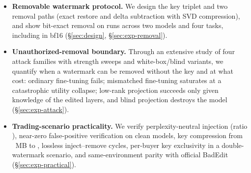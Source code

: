 \documentclass[conference,10pt]{IEEEtran}
\begin{document}
\begin{itemize}
\item \textbf{Removable watermark protocol.} We design the key triplet and
two removal paths (exact restore and delta subtraction with SVD
compression), and show bit-exact removal on \hashRestored{} runs across two
models and four tasks, including \llamasevenb{} in bf16
(\S\ref{sec:design}, \S\ref{sec:exp-removal}).
\item \textbf{Unauthorized-removal boundary.} Through an extensive study of
four attack families with strength sweeps and white-box/blind variants, we
quantify when a watermark can be removed without the key and at what cost:
ordinary fine-tuning fails; mismatched fine-tuning saturates at a
catastrophic utility collapse; low-rank projection succeeds only given
knowledge of the edited layers, and blind projection destroys the model
(\S\ref{sec:exp-attack}).
\item \textbf{Trading-scenario practicality.} We verify perplexity-neutral
injection (ratio \pplRatio{}), near-zero false-positive verification on
clean models, key compression from \keyDense{}~MB to \keyTopOne{},
lossless inject--remove cycles, per-buyer key exclusivity in a
double-watermark scenario, and same-environment parity with official
BadEdit (\S\ref{sec:exp-practical}).
\end{itemize}
\end{document}

